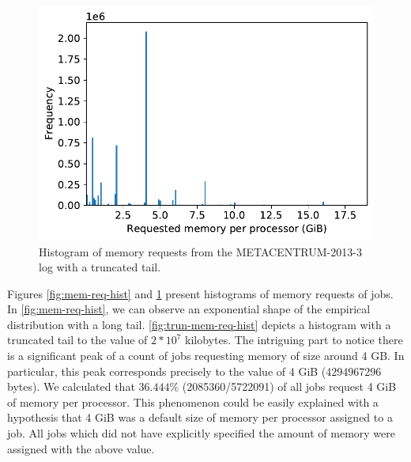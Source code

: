 \documentclass[thesis-en.tex]{subfiles}
\begin{document}
\begin{figure}[htb]
    \includegraphics[width=\textwidth]{images/truncated_memory_requests_histogram.pdf}
    \caption{Histogram of memory requests from the METACENTRUM-2013-3 log with a truncated tail.}
    \label{fig:trun-mem-req-hist}
\end{figure}


Figures \ref{fig:mem-req-hist} and \ref{fig:trun-mem-req-hist} present histograms of memory requests of jobs. In \autoref{fig:mem-req-hist}, we can observe an exponential shape of the empirical distribution with a long tail. \autoref{fig:trun-mem-req-hist} depicts a histogram with a truncated tail to the value of $2*10^7$ kilobytes. The intriguing part to notice there is a significant peak of a count of jobs requesting memory of size around 4 GB. In particular, this peak corresponds precisely to the value of 4 GiB (4294967296 bytes). We calculated that $36.444\%$ (2085360/5722091) of all jobs request 4 GiB of memory per processor. This phenomenon could be easily explained with a hypothesis that 4 GiB was a default size of memory per processor assigned to a job. All jobs which did not have explicitly specified the amount of memory were assigned with the above value.
\end{document}
